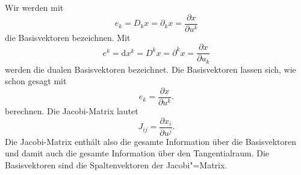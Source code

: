 \documentclass[a4paper,11pt,fleqn,twocolumn,twoside]{scrartcl}
\numberwithin{equation}{section}
\begin{document}
Wir werden mit
\begin{equation}
e_k = D_kx = \partial_kx = \frac{\partial x}{\partial u^k}
\end{equation}
die Basisvektoren bezeichnen. Mit
\begin{equation}
e^k = \mathrm dx^k = D^kx = \partial^kx = \frac{\partial x}{\partial u_k}
\end{equation}
werden die dualen Basisvektoren bezeichnet. Die Basisvektoren lassen
sich, wie schon gesagt mit
\begin{equation}
e_k = \frac{\partial x}{\partial u^k}.
\end{equation}
berechnen. Die Jacobi-Matrix lautet
\begin{equation}
J_{ij} = \frac{\partial x_i}{\partial u^j}.
\end{equation}
Die Jacobi-Matrix enthält also die gesamte Information über die
Basisvektoren und damit auch die gesamte Information über den
Tangentialraum. Die Basisvektoren sind die Spaltenvektoren der
Jacobi"=Matrix.
\end{document}
